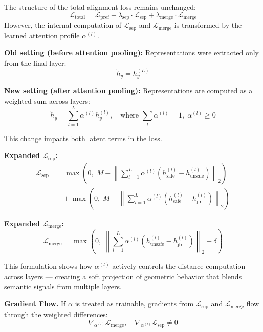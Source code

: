 The structure of the total alignment loss remains unchanged:
\[
\mathcal{L}_{\mathrm{total}} = \mathcal{L}_{\mathrm{pref}} + \lambda_{\mathrm{sep}} \cdot \mathcal{L}_{\mathrm{sep}} + \lambda_{\mathrm{merge}} \cdot \mathcal{L}_{\mathrm{merge}}
\]
However, the internal computation of $\mathcal{L}_{\mathrm{sep}}$ and $\mathcal{L}_{\mathrm{merge}}$ is transformed by the learned attention profile $\alpha^{(l)}$.

\vspace{1mm}
\noindent\textbf{Old setting (before attention pooling):} Representations were extracted only from the final layer:
\[
\tilde{h}_y = h_y^{(L)}
\]

\vspace{1mm}
\noindent\textbf{New setting (after attention pooling):} Representations are computed as a weighted sum across layers:
\[
\tilde{h}_y = \sum_{l=1}^{L} \alpha^{(l)} h_y^{(l)}, \quad \text{where } \sum_l \alpha^{(l)} = 1,\; \alpha^{(l)} \geq 0
\]

This change impacts both latent terms in the loss.

\vspace{1mm}
\noindent\textbf{Expanded $\mathcal{L}_{\mathrm{sep}}$:}
\[
\begin{aligned}
\mathcal{L}_{\mathrm{sep}} &=
\max\left(0,\; M - \left\| \sum_{l=1}^L \alpha^{(l)} \left( h^{(l)}_{\text{safe}} - h^{(l)}_{\text{unsafe}} \right) \right\|_2 \right) \\
&\quad + \max\left(0,\; M - \left\| \sum_{l=1}^L \alpha^{(l)} \left( h^{(l)}_{\text{safe}} - h^{(l)}_{\text{jb}} \right) \right\|_2 \right)
\end{aligned}
\]

\vspace{1mm}
\noindent\textbf{Expanded $\mathcal{L}_{\mathrm{merge}}$:}
\[
\mathcal{L}_{\mathrm{merge}} =
\max\left(0,\; \left\| \sum_{l=1}^L \alpha^{(l)} \left( h^{(l)}_{\text{unsafe}} - h^{(l)}_{\text{jb}} \right) \right\|_2 - \delta \right)
\]

This formulation shows how $\alpha^{(l)}$ actively controls the distance computation across layers — creating a soft projection of geometric behavior that blends semantic signals from multiple layers.

\vspace{1mm}
\noindent\textbf{Gradient Flow.}
If $\alpha$ is treated as trainable, gradients from $\mathcal{L}_{\mathrm{sep}}$ and $\mathcal{L}_{\mathrm{merge}}$ flow through the weighted differences:
\[
\nabla_{\alpha^{(l)}} \mathcal{L}_{\mathrm{merge}},\quad \nabla_{\alpha^{(l)}} \mathcal{L}_{\mathrm{sep}} \neq 0
\]

